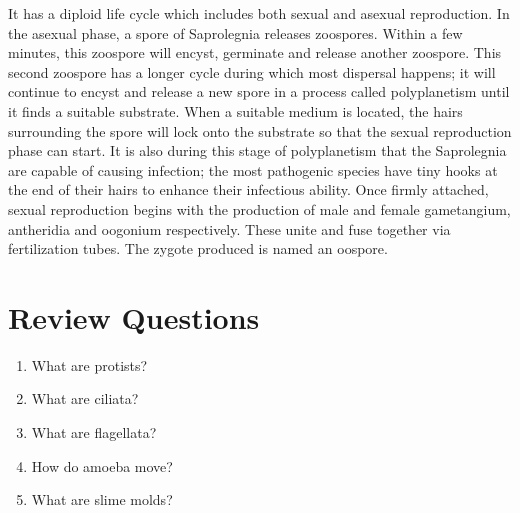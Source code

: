 \documentclass[]{book}
\providecommand{\tightlist}{%
  \setlength{\itemsep}{0pt}\setlength{\parskip}{0pt}}
\theoremstyle{definition}
\theoremstyle{definition}
\theoremstyle{definition}
\theoremstyle{remark}
\begin{document}
It has a diploid life cycle which includes both sexual and asexual
reproduction. In the asexual phase, a spore of Saprolegnia releases
zoospores. Within a few minutes, this zoospore will encyst, germinate
and release another zoospore. This second zoospore has a longer cycle
during which most dispersal happens; it will continue to encyst and
release a new spore in a process called polyplanetism until it finds a
suitable substrate. When a suitable medium is located, the hairs
surrounding the spore will lock onto the substrate so that the sexual
reproduction phase can start. It is also during this stage of
polyplanetism that the Saprolegnia are capable of causing infection; the
most pathogenic species have tiny hooks at the end of their hairs to
enhance their infectious ability. Once firmly attached, sexual
reproduction begins with the production of male and female gametangium,
antheridia and oogonium respectively. These unite and fuse together via
fertilization tubes. The zygote produced is named an oospore.

\section{Review Questions}\label{review-questions-10}

\begin{enumerate}
\def\labelenumi{\arabic{enumi}.}
\tightlist
\item
  What are protists?
\item
  What are ciliata?
\item
  What are flagellata?
\item
  How do amoeba move?
\item
  What are slime molds?
\end{enumerate}
\end{document}
